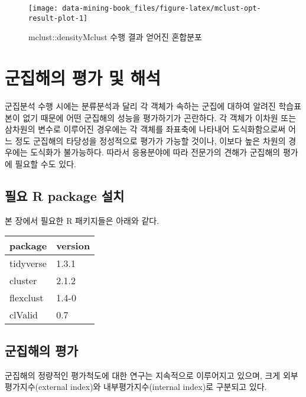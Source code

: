 \documentclass[
]{book}
\begin{document}
\begin{figure}

{\centering \texttt{[image: data-mining-book\_files/figure-latex/mclust-opt-result-plot-1]} 

}

\caption{mclust::densityMclust 수행 결과 얻어진 혼합분포}\label{fig:mclust-opt-result-plot}
\end{figure}

\hypertarget{cluster-solution-evaluation}{%
\chapter{군집해의 평가 및 해석}\label{cluster-solution-evaluation}}

군집분석 수행 시에는 분류분석과 달리 각 객체가 속하는 군집에 대하여 알려진 학습표본이 없기 때문에 어떤 군집해의 성능을 평가하기가 곤란하다. 각 객체가 이차원 또는 삼차원의 변수로 이루어진 경우에는 각 객체를 좌표축에 나타내어 도식화함으로써 어느 정도 군집해의 타당성을 정성적으로 평가가 가능할 것이나, 이보다 높은 차원의 경우에는 도식화가 불가능하다. 따라서 응용분야에 따라 전문가의 견해가 군집해의 평가에 필요할 수도 있다.

\hypertarget{cluster-solution-evaluation-packages-install}{%
\section{필요 R package 설치}\label{cluster-solution-evaluation-packages-install}}

본 장에서 필요한 R 패키지들은 아래와 같다.

\begin{tabular}{l|l}
\hline
package & version\\
\hline
tidyverse & 1.3.1\\
\hline
cluster & 2.1.2\\
\hline
flexclust & 1.4-0\\
\hline
clValid & 0.7\\
\hline
\end{tabular}

\hypertarget{cluster-solution-evaluation-metric}{%
\section{군집해의 평가}\label{cluster-solution-evaluation-metric}}

군집해의 정량적인 평가척도에 대한 연구는 지속적으로 이루어지고 있으며, 크게 외부평가지수(external index)와 내부평가지수(internal index)로 구분되고 있다.
\end{document}
